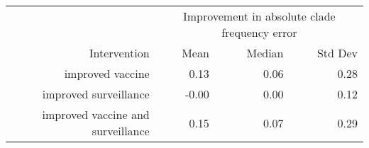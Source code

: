 
\begin{tabular*}{0.7\textwidth}{rrrr}
\toprule
             & \multicolumn{3}{c}{Improvement in absolute clade frequency error} \\
Intervention & Mean & Median & Std Dev \\
\midrule

improved vaccine & 0.13 & 0.06 & 0.28 \\
improved surveillance & -0.00 & 0.00 & 0.12 \\
improved vaccine and surveillance & 0.15 & 0.07 & 0.29 \\

\bottomrule
\end{tabular*}

